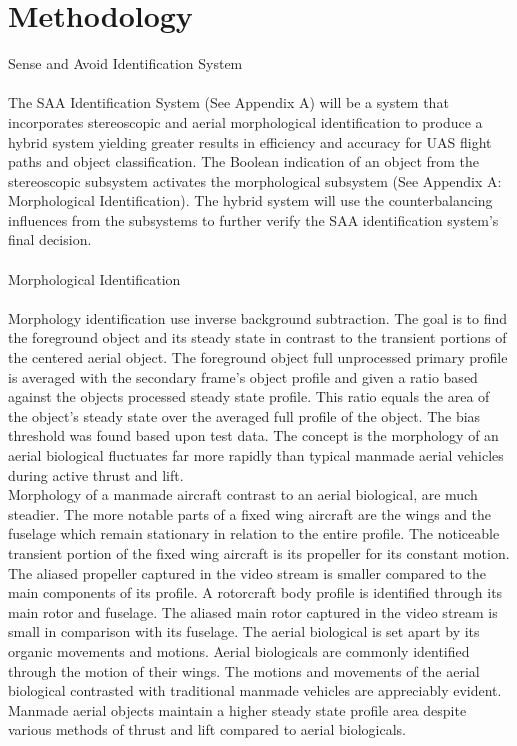 \section{Methodology}
Sense and Avoid Identification System\\ \\
\indent The SAA Identification System (See Appendix A) will be a system that incorporates stereoscopic and aerial morphological identification to produce a hybrid system yielding greater results in efficiency and accuracy for UAS flight paths and object classification. The Boolean indication of an object from the stereoscopic subsystem activates the morphological subsystem (See Appendix A: Morphological Identification). The hybrid system will use the counterbalancing influences from the subsystems to further verify the SAA identification system’s final decision.\\ \\                 
Morphological Identification\\ \\
\indent Morphology identification use inverse background subtraction. The goal is to find the foreground object and its steady state in contrast to the transient portions of the centered aerial object. The foreground object full unprocessed primary profile is averaged with the secondary frame’s object profile and given a ratio based against the objects processed steady state profile. This ratio equals the area of the object’s steady state over the averaged full profile of the object. The bias threshold was found based upon test data. The concept is the morphology of an aerial biological fluctuates far more rapidly than typical manmade aerial vehicles during active thrust and lift.\\
\indent Morphology of a manmade aircraft contrast to an aerial biological, are much steadier. The more notable parts of a fixed wing aircraft are the wings and the fuselage which remain stationary in relation to the entire profile. The noticeable transient portion of the fixed wing aircraft is its propeller for its constant motion. The aliased propeller captured in the video stream is smaller compared to the main components of its profile. A rotorcraft body profile is identified through its main rotor and fuselage. The aliased main rotor captured in the video stream is small in comparison with its fuselage. The aerial biological is set apart by its organic movements and motions. Aerial biologicals are commonly identified through the motion of their wings. The motions and movements of the aerial biological contrasted with traditional manmade vehicles are appreciably evident. Manmade aerial objects maintain a higher steady state profile area despite various methods of thrust and lift compared to aerial biologicals.\\
